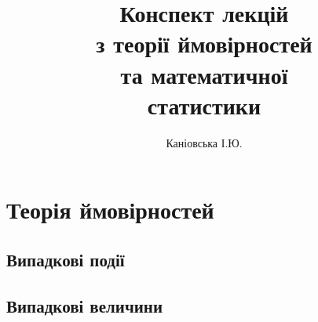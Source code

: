 \documentclass{report}
\author{\Huge Каніовська І.Ю.}
\title{
    \textbf{\fontsize{40}{48}\selectfont Конспект лекцій \\з теорії ймовірностей \\та математичної \\\vspace{0.64em}статистики}
    }
\date{}
\begin{document}
 
    \maketitle
    \setcounter{page}{2}
    \tableofcontents
    \part{Теорія ймовірностей}
    \chapter{Випадкові події}
        
        
        
        
    \chapter{Випадкові величини}
        
        
        
\end{document}
